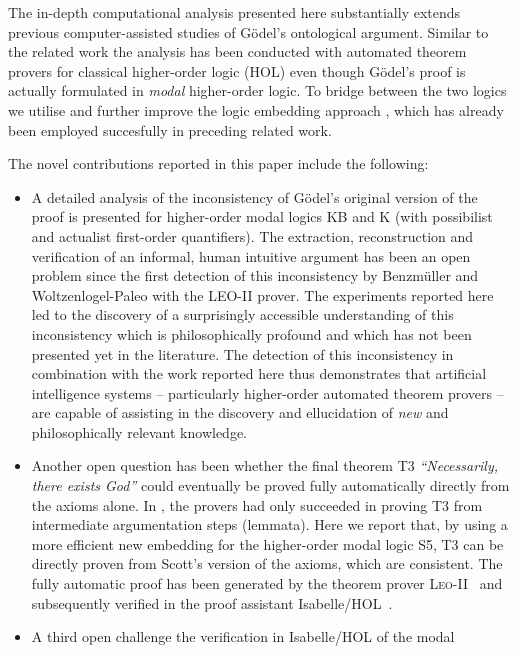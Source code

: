 \documentclass{article}
\begin{document}
The in-depth computational analysis presented here substantially
extends previous computer-assisted studies of G\"odel's ontological
argument. Similar to the related work \cite{J30,C40} the analysis has
been conducted with automated theorem provers for classical
higher-order logic (HOL) even though G\"odel's proof is actually
formulated in \emph{modal} higher-order logic. To bridge between the two
logics we utilise and further improve the logic embedding
approach \cite{J23,C40}, which has already been employed succesfully in preceding related work.


The novel contributions reported in this paper include the following:


\begin{itemize}
\item A detailed analysis of the inconsistency of G\"{o}del's
   original version of the proof is presented
  for higher-order modal logics KB and K (with possibilist and
  actualist first-order quantifiers). The extraction, reconstruction
  and verification of an informal, human intuitive argument has been
  an open problem since the first detection of this inconsistency by
  Benzmüller and Woltzenlogel-Paleo  with the LEO-II prover. 
  The experiments reported here led to the discovery of a surprisingly accessible
  understanding of this inconsistency which is philosophically
  profound and which has not been presented yet in the
  literature. The detection of this inconsistency in combination with
  the work reported here thus demonstrates that artificial intelligence systems -- 
  particularly higher-order automated
  theorem provers -- are capable of assisting in the discovery and ellucidation of
  \emph{new} and philosophically relevant knowledge. 
\item Another open question has been whether the final theorem T3 \textit{``Necessarily, there
    exists God''} could eventually be proved fully automatically
  directly from the axioms alone. In , the provers had only succeeded in proving 
  T3 from intermediate argumentation steps (lemmata). Here we report that, by using a more efficient new
  embedding for the higher-order modal logic S5, T3 can be directly proven from Scott's version of the axioms, which are consistent. The fully automatic proof has been
  generated by the theorem prover \textsc{Leo-II}~\cite{C26} and
  subsequently verified in the proof assistant
  Isabelle/HOL~\cite{NPW02}.
\item A third open challenge the verification in Isabelle/HOL of the modal

\end{itemize}
\end{document}
